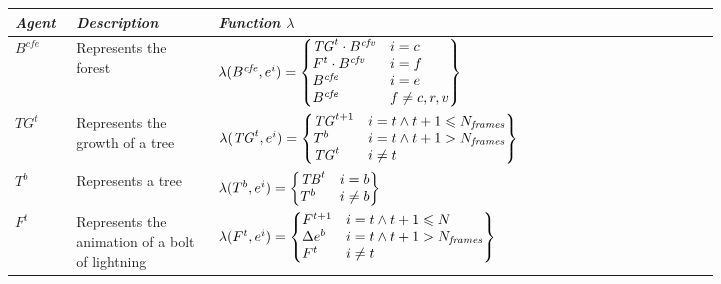 \documentclass[runningheads]{llncs}
\begin{document}
\begin{table}[h]
\begin{center}
\begin{small}
\begin{tabular}{|p{0.05\linewidth}|p{0.17\linewidth}|p{0.6\linewidth}|}

	\hline 
	\itshape Agent & \itshape Description & \itshape Function ${\lambda}$\\
	\hline

	$B^{cfe}$ & Represents the forest &
	$\lambda
	(B^{\mathit{cfe}},e^{i})=\left\{\begin{matrix}\mathit{TG}^{t}\cdot
	B^{\mathit{cfv}}\hfill\null &i=c\hfill\null \\F^{t}\cdot
	B^{\mathit{cfv}}\hfill\null &i=f\hfill\null
	\\B^{\mathit{cfe}}\hfill\null &i=e\hfill\null
	\\B^{\mathit{cfe}}\hfill\null &f\neq c,r,v\hfill\null
	\end{matrix}\right\}$ \\

	\hline

	$TG^{t}$ & Represents the growth of a tree &
	$\lambda
	(\mathit{TG}^{t},e^{i})=\left\{\begin{matrix}\mathit{TG}^{t+1}\hfill\null
	&i=t\wedge t+1\leqslant N_{\mathit{frames}}\hfill\null
	\\T^{b}\hfill\null &i=t\wedge t+1>N_{\mathit{frames}}\hfill\null
	\\\mathit{TG}^{t}\hfill\null &i\neq t\hfill\null \end{matrix}\right\}$ \\

	\hline

	$T^{b}$ & Represents a tree &
	$\lambda (T^{b},e^{i})=\left\{\begin{matrix}\mathit{TB}^{t}\hfill\null
	&i=b\hfill\null \\T^{b}\hfill\null &i\neq b\hfill\null
	\end{matrix}\right\}$ \\

	\hline

	$F^{t}$ & Represents the animation of a bolt of lightning  &
	$\lambda (F^{t},e^{i})=\left\{\begin{matrix}F^{t+1}\hfill\null
	&i=t\wedge t+1\leqslant N\hfill\null \\\Delta e^{b}\hfill\null
	&i=t\wedge t+1>N_{\mathit{frames}}\hfill\null \\F^{t}\hfill\null &i\neq
	t\hfill\null \end{matrix}\right\}$ \\


\end{tabular}
\end{small}
\end{center}
\end{table}
\end{document}
